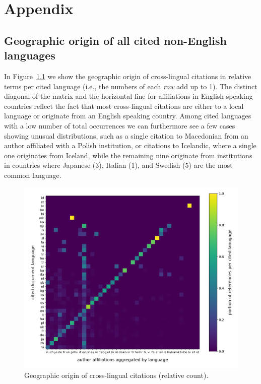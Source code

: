 \chapter{Appendix}

\section{Geographic origin of all cited non-English languages}\label{sec:apndx_geo}

In Figure~\ref{fig:geo_full} we show the geographic origin of cross-lingual citations in relative terms per cited language (i.e., the numbers of each \emph{row} add up to 1). The distinct diagonal of the matrix and the horizontal line for affiliations in English speaking countries reflect the fact that most cross-lingual citations are either to a local language or originate from an English speaking country. Among cited languages with a low number of total occurrences we can furthermore see a few cases showing unusual distributions, such as a single citation to Macedonian from an author affiliated with a Polish institution, or citations to Icelandic, where a single one originates from Iceland, while the remaining nine originate from institutions in countries where Japanese (3), Italian (1), and Swedish (5) are the most common language.

\begin{figure}[tb]
\centering
\includegraphics[width=\textwidth]{figures/ref_xling/citlang_to_author_aff_all_relative_crop.pdf}
\caption{Geographic origin of cross-lingual citations (relative count).} \label{fig:geo_full}
\end{figure}

